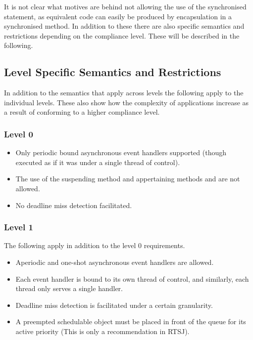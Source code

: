 It is not clear what motives are behind not allowing the use of the synchronised statement, as equivalent code can easily be produced by encapsulation in a synchronised method.
In addition to these there are also specific semantics and restrictions depending on the compliance level. These will be described in the following.


\subsection{Level Specific Semantics and Restrictions} %
\label{sub:level_specific_restrictions}
In addition to the semantics that apply across levels the following apply to the individual levels. These also show how the complexity of applications increase as a result of conforming to a higher compliance level.

\subsubsection{Level 0}
\begin{itemize}
	\item Only periodic bound asynchronous event handlers supported (though executed as if it was under a single thread of control).
	\item The use of the suspending method  and appertaining methods  and  are not allowed.
	\item No deadline miss detection facilitated.
\end{itemize}

\subsubsection{Level 1}
The following apply in addition to the level 0 requirements.
\begin{itemize}
	\item Aperiodic and one-shot asynchronous event handlers are allowed.
	\item Each event handler is bound to its own thread of control, and similarly, each thread only serves a single handler.
	\item Deadline miss detection is facilitated under a certain granularity.
	\item A preempted schedulable object must be placed in front of the queue for its active priority (This is only a recommendation in RTSJ).
\end{itemize}

